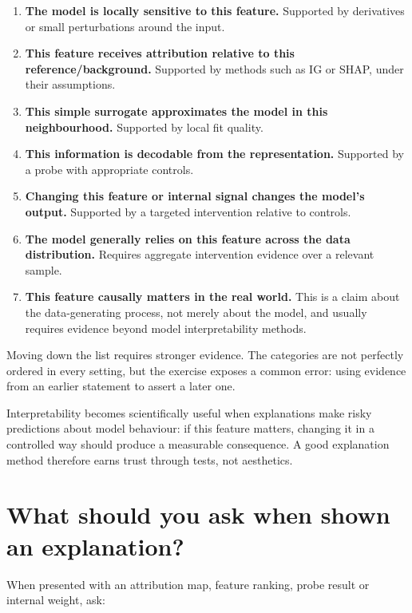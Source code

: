 \begin{enumerate}[leftmargin=*]
  \item \textbf{The model is locally sensitive to this feature.} Supported by derivatives or small perturbations around the input.
  \item \textbf{This feature receives attribution relative to this reference/background.} Supported by methods such as IG or SHAP, under their assumptions.
  \item \textbf{This simple surrogate approximates the model in this neighbourhood.} Supported by local fit quality.
  \item \textbf{This information is decodable from the representation.} Supported by a probe with appropriate controls.
  \item \textbf{Changing this feature or internal signal changes the model's output.} Supported by a targeted intervention relative to controls.
  \item \textbf{The model generally relies on this feature across the data distribution.} Requires aggregate intervention evidence over a relevant sample.
  \item \textbf{This feature causally matters in the real world.} This is a claim about the data-generating process, not merely about the model, and usually requires evidence beyond model interpretability methods.
\end{enumerate}

Moving down the list requires stronger evidence. The categories are not perfectly ordered in every setting, but the exercise exposes a common error: using evidence from an earlier statement to assert a later one.

\begin{keyidea}
Interpretability becomes scientifically useful when explanations make risky predictions about model behaviour: if this feature matters, changing it in a controlled way should produce a measurable consequence. A good explanation method therefore earns trust through tests, not aesthetics.
\end{keyidea}

\section{What should you ask when shown an explanation?}

When presented with an attribution map, feature ranking, probe result or internal weight, ask:

